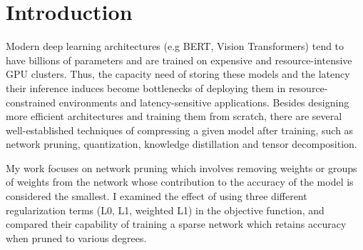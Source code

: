 \section*{Introduction}

Modern deep learning architectures (e.g BERT, Vision Transformers) tend to have billions of parameters and are trained on expensive
and resource-intensive GPU clusters. Thus, the capacity need of storing these models and the latency their inference induces become bottlenecks of
deploying them in resource-constrained environments and latency-sensitive applications.  Besides designing more efficient architectures and training 
them from scratch, there are several well-established techniques of compressing a given model after training, such as network pruning, quantization,
knowledge distillation and tensor decomposition. 

My work focuses on network pruning which involves removing weights or groups of weights from the 
network whose contribution to the accuracy of the model is considered the smallest. I examined the effect of using three different regularization 
terms (L0, L1, weighted L1) in the objective function, and compared their capability of training a sparse network which retains accuracy when pruned 
to various degrees. 